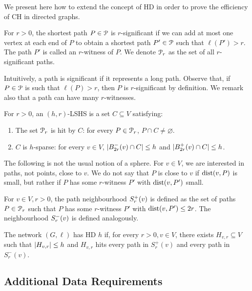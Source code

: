 \label{sec:ch}
We present here how to extend the concept of HD in order to prove the efficiency of CH in directed graphs.

\begin{definition}
	For $r>0$, the shortest path $P\in\mathcal{P}$ is $r$-significant if we can add at most one vertex at each end of $P$ to obtain a shortest path $P'\in\mathcal{P}$ such that $\ell(P')>r$.
	The path $P'$ is called an $r$-witness of $P$.
	We denote $\mathcal{P}_r$ as the set of all $r$-significant paths.
\end{definition}


Intuitively, a path is significant if it represents a long path.
Observe that, if $P\in \mathcal{P}$ is such that $\ell(P)>r$, then $P$ is $r$-significant by definition.
We remark also that a path can have many $r$-witnesses.

\begin{definition}
	For $r>0$, an $(h,r)$-LSHS is a set $C\subseteq V$ satisfying: 
	\begin{enumerate}
		\item The set $\mathcal{P}_r$ is hit by $C$: for every $P\in\mathcal{P}_r$, $P\cap C\not=\varnothing$.
		\item $C$ is $h$-sparse: for every $v\in V$, $\lvert B^-_{2r}(v)\cap C\rvert\leq h$ and $\lvert B^+_{2r}(v)\cap C\rvert\leq h$.
	\end{enumerate}
\end{definition}

The following is not the usual notion of a sphere.
For $v\in V$, we are interested in paths, not points, close to $v$.
We do not say that $P$ is close to $v$ if $\text{dist}(v,P)$ is small, but rather if $P$ has some $r$-witness $P'$ with $\text{dist}(v,P')$ small.


\begin{definition}
	For $v\in V, r>0$, the path neighbourhood  $S^+_r(v)$ is defined as the set of paths $P\in\mathcal{P}_r$ such that $P$ has some $r$-witness $P'$ with $\text{dist}(v,P')\leq 2r$.
	The neighbourhood $S^-_r(v)$ is defined analogously.
\end{definition}

\begin{definition}
	The network $(G,\ell)$ has HD $h$ if, for every $r>0, v\in V$, there exists $H_{v,r}\subseteq V$ such that $\lvert H_{v,r}\rvert\leq h$ and $H_{v,r}$ hits every path in $S_r^+(v)$ and every path in $S_r^-(v)$.
\end{definition}


\subsection{Additional Data Requirements}

